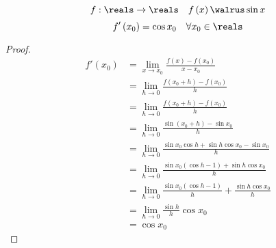 \begin{lemma}
  $$f:\reals\to\reals\quad f\left(x\right)\walrus \sin x$$
  $$f'\left(x_0\right)=\cos x_0\quad \forall x_0\in\reals$$
\end{lemma}
\begin{proof}
  \begin{align*}
    f'\left(x_0\right) & =\lim_{x\to x_0}\frac{f\left(x\right)-f\left(x_0\right)}{x-x_0}               \\
                       & =\lim_{h\to0}\frac{f\left(x_0+h\right)-f\left(x_0\right)}{h}                  \\
                       & =\lim_{h\to0}\frac{f\left(x_0+h\right)-f\left(x_0\right)}{h}                  \\
                       & =\lim_{h\to0}\frac{\sin\left(x_0+h\right)-\sin x_0}{h}                        \\
                       & =\lim_{h\to0}\frac{\sin x_0\cos h+\sin h\cos x_0-\sin x_0}{h}                 \\
                       & =\lim_{h\to0}\frac{\sin x_0\left(\cos h-1\right)+\sin h\cos x_0}{h}           \\
                       & =\lim_{h\to0}\frac{\sin x_0\left(\cos h-1\right)}{h}+\frac{\sin h\cos x_0}{h} \\
                       & =\lim_{h\to0}\frac{\sin h}{h}\cos x_0                                         \\
                       & =\cos x_0                                                                     
  \end{align*}
\end{proof}

